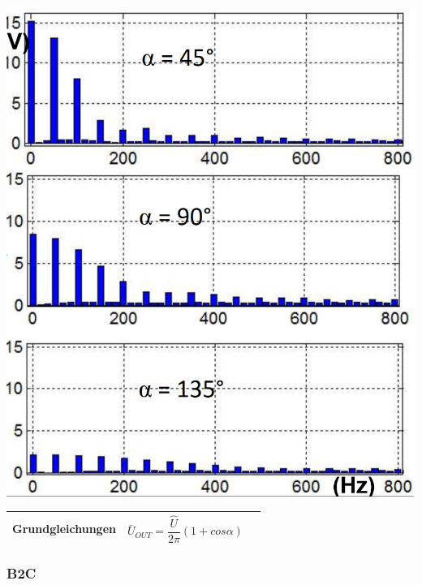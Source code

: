 \begin{minipage}{0.25\linewidth}
    \includegraphics[width=\linewidth]{images/M1COW} 
\end{minipage}
\newline

\begin{longtable}{| p{} | p{} | p{} |} %
    \hline
    \textbf{Grundgleichungen}&
    \[ \bar{U}_{OUT} = \dfrac{\hat{U}}{2\pi}(1+cos \alpha)\]&\\
    \hline   
\end{longtable}



\subsubsection{B2C}

